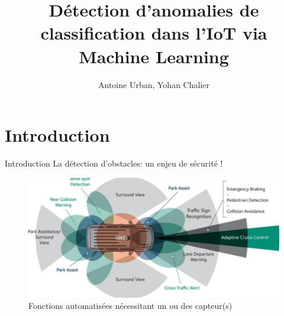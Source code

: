 \documentclass[usenames,dvipsnames]{beamer}
\title{Détection d'anomalies de classification dans l'IoT via Machine Learning}
\author{Antoine Urban, Yohan Chalier}
\institute{Projet de filière SR2I \\ Télécom ParisTech}
\begin{document}
\begin{frame}
\titlepage
\end{frame}

\section{Introduction}

\begin{frame}{Introduction}
La détection d'obstacles: un enjeu de sécurité !
\begin{figure}
\centering
\includegraphics[width=.8\textwidth]{img/sensors.png}
\caption{Fonctions automatisées nécessitant un ou des capteur(s)}
\end{figure}
\end{frame}
\end{document}
